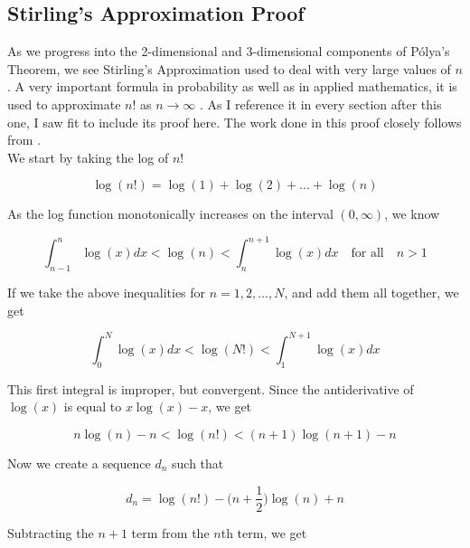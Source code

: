 \documentclass[11pt]{article}
\begin{document}
\subsection{Stirling's Approximation Proof}

\indent \indent As we progress into the 2-dimensional and 3-dimensional components of Pólya's Theorem, we see Stirling's Approximation used to deal with very large values of $n$. A very important formula in probability as well as in applied mathematics, it is used to approximate $n!$ as $n \to \infty$ . As I reference it in every section after this one, I saw fit to include its proof here. The work done in this proof closely follows from \cite{khamsi}.
\\

\noindent We start by taking the log of $n!$

\begin{equation}
\log{(n!)} = \log{(1)} + \log{(2)} + ... + \log{(n)}
\end{equation}

\noindent As the log function monotonically increases on the interval $(0, \infty)$, we know

\begin{equation}
\int_{n-1}^{n}\log{(x)}dx < \log{(n)} < \int_{n}^{n+1}\log{(x)}dx \quad \text{for all}\quad n > 1
\end{equation}

\noindent If we take the above inequalities for $n = 1, 2, ... , N$, and add them all together, we get

\begin{equation}
\int_{0}^{N}\log{(x)}dx < \log{(N!)} < \int_{1}^{N+1}\log{(x)}dx
\end{equation}

This first integral is improper, but convergent. Since the antiderivative of $\log{(x)}$ is equal to $x \log{(x)} - x$, we get

\begin{equation}
n\log{(n)} - n < \log{(n!)} < (n + 1) \log{(n+1)} - n
\end{equation}

\noindent Now we create a sequence $d_{n}$ such that

\begin{equation}
d_{n} = \log{(n!)} - \bigg(n + \frac{1}{2}\bigg)\log{(n)} + n
\end{equation}

\noindent Subtracting the $n+1$ term from the $n$th term, we get 
\end{document}
